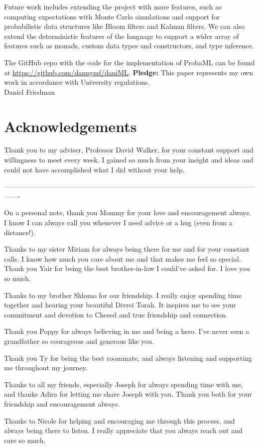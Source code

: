 \documentclass[pageno]{jpaper}
\begin{document}
Future work includes extending the project with more features, such as computing expectations with Monte Carlo simulations and support for probabilistic data structures like Bloom filters and Kalman filters. We can also extend the deterministic features of the language to support a wider array of features such as monads, custom data types and constructors, and type inference.

\newpage
{}


The GitHub repo with the code for the implementation of ProbaML can be found at \newline
\url{https://github.com/dannymf/daniML}. \newline \break
\textbf{Pledge:} This paper represents my own work in accordance with University regulations. \\
Daniel Friedman

\newpage
\section*{Acknowledgements}
Thank you to my adviser, Professor David Walker, for your constant support and willingness to meet every week. I gained so much from your insight and ideas and could not have accomplished what I did without your help.

-------------------------------------------------------------------------------------------------------------------

On a personal note, thank you Mommy for your love and encouragement always. I know I can always call you whenever I need advice or a hug (even from a distance!).

Thanks to my sister Miriam for always being there for me and for your constant calls. I know how much you care about me and that makes me feel so special. Thank you Yair for being the best brother-in-law I could've asked for. I love you so much.

Thanks to my brother Shlomo for our friendship. I really enjoy spending time together and hearing your beautiful Divrei Torah. It inspires me to see your commitment and devotion to Chesed and true friendship and connection.

Thank you Poppy for always believing in me and being a hero. I've never seen a grandfather so courageous and generous like you.

Thank you Ty for being the best roommate, and always listening and supporting me throughout my journey.

Thanks to all my friends, especially Joseph for always spending time with me, and thanks Adira for letting me share Joseph with you. Thank you both for your friendship and encouragement always.

Thanks to Nicole for helping and encouraging me through this process, and always being there to listen. I really appreciate that you always reach out and care so much.
\end{document}
